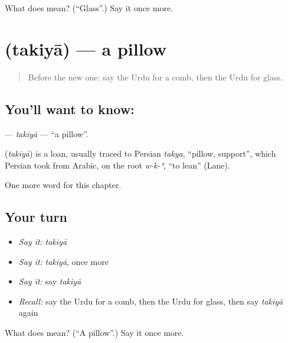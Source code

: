 \begin{tcolorbox}[breakable,colback=teal!4,colframe=teal!35!black,title={Before you move on}]
What does  mean? (\textquotedblleft{}Glass\textquotedblright{}.) Say it once more.
\end{tcolorbox}
\section[\texorpdfstring{\ur{تکیہ} (takiyā)}{تکیہ (takiyā)}]{ (takiyā) — a pillow}

\label{lesson:UR-C106-takiya}



\begin{quote}
Before the new one: say the Urdu for a comb, then the Urdu for glass.
\end{quote}

\subsection*{You'll want to know: }
\textbf{} — \emph{takiyā} — \textquotedblleft{}a pillow\textquotedblright{}.

\begin{cousinweb}
\textbf{} (\emph{takiyā}) is a loan, usually traced to Persian \emph{takya}, \textquotedblleft{}pillow, support\textquotedblright{}, which Persian took from Arabic, on the root \emph{w-k-ʾ}, \textquotedblleft{}to lean\textquotedblright{} (Lane).
\end{cousinweb}

\begin{grammarlens}[title={What you've built}]
One more word for this chapter.
\end{grammarlens}

\subsection*{Your turn}
\begin{itemize}
\raggedright
  \item \emph{Say it:} \emph{takiyā}
  \item \emph{Say it:} \emph{takiyā}, once more
  \item \emph{Say it:} say \emph{takiyā}
  \item \emph{Recall:} say the Urdu for a comb, then the Urdu for glass, then say \emph{takiyā} again
\end{itemize}

\begin{tcolorbox}[breakable,colback=teal!4,colframe=teal!35!black,title={Before you move on}]
What does  mean? (\textquotedblleft{}A pillow\textquotedblright{}.) Say it once more.
\end{tcolorbox}
